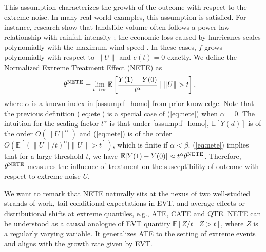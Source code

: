 \documentclass[12pt]{article}
\theoremstyle{plain}
\theoremstyle{definition}
\begin{document}
This assumption characterizes the growth of the outcome with respect to the extreme noise.  In many real-world examples, this assumption is satisfied. For instance, research show that landslide volume often follows a power-law relationship with rainfall intensity {\cite{tuganishuri2024prediction}}; the economic loss caused by hurricanes scales polynomially with the maximum wind speed {\cite{zhai2014dependence}}. In these cases, $f$ grows polynomially with respect to $\|U\|$ and $e(t) = 0$ exactly.  We define the Normalized Extreme Treatment Effect (NETE) as
\begin{align}\label{eq:nete}
  \theta^{\tmop{NETE}} & = \lim_{t \rightarrow \infty} \mathbb{E} \left[ \frac{Y(1) - Y(0)}{t^{\alpha}} \mid \|U\|> t \right],
\end{align}
where $\alpha$ is a known index in \cref{assump:f_homo} from prior knowledge. Note that the previous definition (\ref{eq:ete}) is a special case of (\ref{eq:nete}) when $\alpha = 0$. The intuition for the scaling factor $t^\alpha$ is that under \cref{assump:f_homo}, $\mathbb{E}[Y(d)] $ is of the order $ O(\| U \|^\alpha) $ and (\ref{eq:nete}) is of the order $ O(\mathbb{E}[(\|U\|/t)^\alpha \mid \|U\|>t]) $, which is finite if $\alpha < \beta$.  (\ref{eq:nete}) implies that for a large threshold $t$, we have $\mathbb{E}[ Y(1) - Y(0)] \approx t^\alpha \theta^{\operatorname{NETE}} $. Therefore, $\theta^{\operatorname{NETE}}$ measures the influence of treatment on the susceptibility of outcome with respect to extreme noise $U$. 

We want to remark that NETE naturally sits at the nexus of two well-studied strands of work, tail-conditional expectations in EVT, and average effects or distributional shifts at extreme quantiles, e.g., ATE, CATE and QTE. NETE can be understood as a causal analogue of EVT quantity $ \mathbb{E}[Z/t \mid Z > t] $, where $Z$ is a regularly varying variable. It generalizes ATE to the setting of extreme events and aligns with the growth rate given by EVT.  
\end{document}
